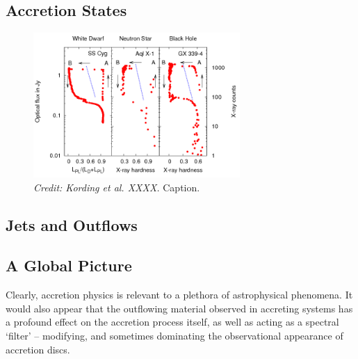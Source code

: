 \subsection{Accretion States}


\begin{figure}
\centering
\includegraphics[width=0.7\textwidth]{figures/02-accretion/kording_hid.png}
\caption
{
{\sl Credit: Kording et al. XXXX.} 
Caption.
} 
\label{fig:kording_hid}
\end{figure}



\subsection{Jets and Outflows}


\subsection{A Global Picture}

Clearly, accretion physics is relevant to a plethora of astrophysical phenomena. 
It would also appear that the outflowing material observed in accreting systems 
has a profound effect on the accretion process itself, as well as acting 
as a spectral `filter' -- modifying, and sometimes dominating the observational 
appearance of accretion discs.